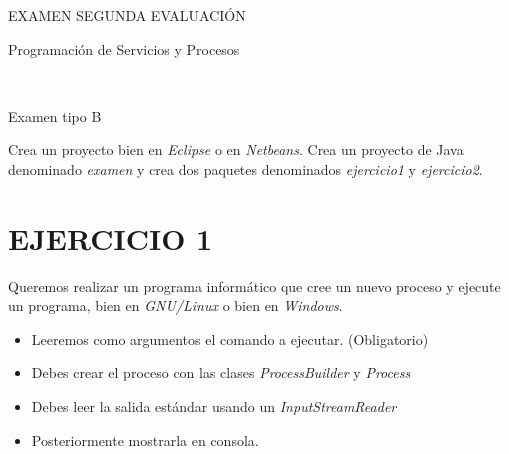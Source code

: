 \documentclass[addpoints]{exam}
\begin{document}
\begin{center}
\begin{Huge}
EXAMEN SEGUNDA EVALUACIÓN
\end{Huge}
\vspace{0.06in}

\begin{huge}
Programación de Servicios y Procesos
\end{huge}\\
\vspace{0.09in}

\begin{LARGE}
Examen tipo B
\end{LARGE}
\vspace{0.1in}

\end{center}
\begin{center}
\end{center}

Crea un proyecto bien en \emph{Eclipse} o en \emph{Netbeans}. Crea un proyecto de Java denominado \emph{examen} y crea dos paquetes denominados \emph{ejercicio1} y \emph{ejercicio2}.
\vspace{0.1in}
\section{EJERCICIO 1}
Queremos realizar un programa informático que cree un nuevo proceso y ejecute un programa, bien en \emph{GNU/Linux} o bien en \emph{Windows}. \\
\begin{itemize}
\item Leeremos como argumentos el comando a ejecutar. (Obligatorio)
\item Debes crear el proceso con las clases \emph{ProcessBuilder} y \emph{Process}
\item Debes leer la salida estándar usando un \emph{InputStreamReader}
\item Posteriormente mostrarla en consola.
\end{itemize}
\end{document}

